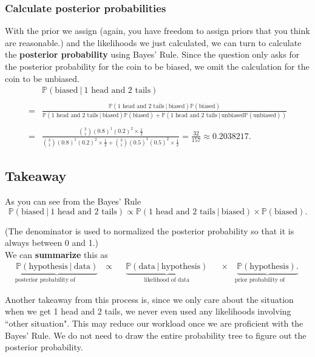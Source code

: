 \documentclass{article}
\def\dsst{\displaystyle}
\begin{document}
\subsubsection*{Calculate posterior probabilities}

With the prior we assign (again, you have freedom to assign priors that you think are reasonable.) and the likelihoods we just calculated, we can turn to calculate the \textbf{posterior probability} using Bayes' Rule. Since the question only asks for the posterior probability for the coin to be biased, we omit the calculation for the coin to be unbiased. 
\begin{align*}
& \mathbb{P}(\text{biased}~|~\text{1 head and 2 tails}) \\
& \\
 = & \frac{\mathbb{P}(\text{1 head and 2 tails}~|~\text{biased})\mathbb{P}(\text{biased})}{\mathbb{P}(\text{1 head and 2 tails}~|~\text{biased})\mathbb{P}(\text{biased}) + \mathbb{P}(\text{1 head and 2 tails}~|~\text{unbiased}\mathbb{P}(\text{unbiased}))}\\
& \\
= & \frac{\dsst \binom{3}{1}(0.8)^1(0.2)^2\times\frac{1}{2}}{\dsst \binom{3}{1}(0.8)^1(0.2)^2\times\frac{1}{2} + \binom{3}{1}(0.5)^1(0.5)^2\times \frac{1}{2}} = \frac{32}{157} \approx 0.2038217.
\end{align*}

\subsection*{Takeaway}

As you can see from the Bayes' Rule 
$$ \mathbb{P}(\text{biased}~|~\text{1 head and 2 tails}) \propto \mathbb{P}(\text{1 head and 2 tails}~|~\text{biased})\times\mathbb{P}(\text{biased}). $$

(The denominator is used to normalized the posterior probability so that it is always between 0 and 1.)\\
 
We can \textbf{summarize} this as
\begin{align*}
	& \underbrace{\mathbb{P}(\text{hypothesis}~|~\text{data})}_\text{posterior probability of hypothesis} & \propto & & \underbrace{\mathbb{P}(\text{data}~|~\text{hypothesis})}_\text{likelihood of data} & & \times & \underbrace{\mathbb{P}(\text{hypothesis}).}_\text{prior probability of hypothesis} &
\end{align*}

\vspace{1cm}
Another takeaway from this process is, since we only care about the situation when we get 1 head and 2 tails, we never even used any likelihoods involving ``other situation". This may reduce our workload once we are proficient with the Bayes' Rule. We do not need to draw the entire probability tree to figure out the posterior probability.
\end{document}
